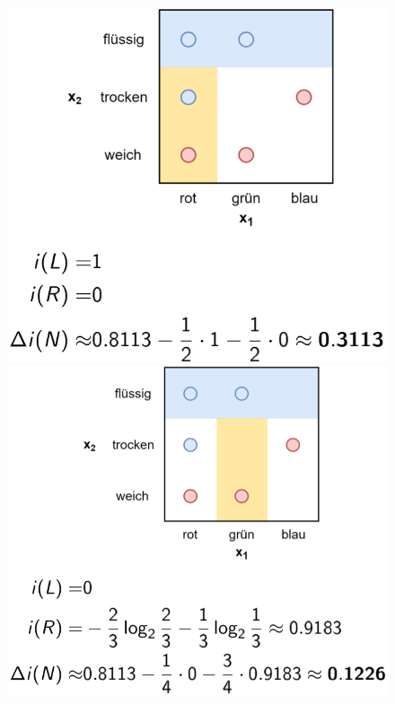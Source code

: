 \documentclass{report}
\begin{document}
\begin{figure}[H]
  \centering
  \begin{minipage}[b]{0.4\textwidth}
    \includegraphics[scale=.235]{ml07_15}
  \end{minipage}
  \begin{minipage}[b]{0.4\textwidth}
    \includegraphics[scale=.235]{ml07_16}
  \end{minipage}
\end{figure}
\end{document}
